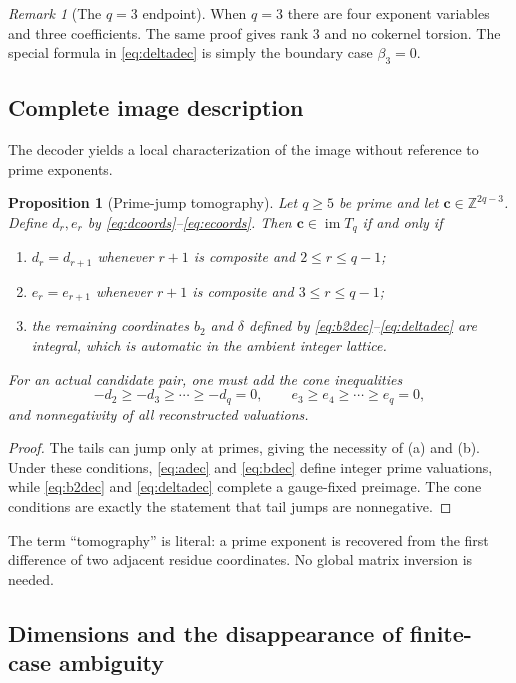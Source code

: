 \documentclass[11pt]{article}
\newtheorem{proposition}[theorem]{Proposition}
\theoremstyle{definition}
\theoremstyle{remark}
\newtheorem{remark}[theorem]{Remark}
\newcommand{\Z}{\mathbb Z}
\newcommand{\im}{\operatorname{im}}
\newcommand{\vct}[1]{\bm{#1}}
\begin{document}
\begin{remark}[The $q=3$ endpoint]
When $q=3$ there are four exponent variables and three coefficients.  The same
proof gives rank $3$ and no cokernel torsion.  The special formula in
\eqref{eq:deltadec} is simply the boundary case $\beta_3=0$.
\end{remark}

\subsection{Complete image description}

The decoder yields a local characterization of the image without reference to
prime exponents.

\begin{proposition}[Prime-jump tomography]\label{prop:tomography}
Let $q\ge5$ be prime and let $\vct c\in\Z^{2q-3}$.  Define $d_r,e_r$ by
\eqref{eq:dcoords}--\eqref{eq:ecoords}.  Then $\vct c\in\im T_q$ if and only if
\begin{enumerate}[label=\textup{(\alph*)}]
\item $d_r=d_{r+1}$ whenever $r+1$ is composite and $2\le r\le q-1$;
\item $e_r=e_{r+1}$ whenever $r+1$ is composite and $3\le r\le q-1$;
\item the remaining coordinates $b_2$ and $\delta$ defined by
\eqref{eq:b2dec}--\eqref{eq:deltadec} are integral, which is automatic in the
ambient integer lattice.
\end{enumerate}
For an actual candidate pair, one must add the cone inequalities
\[
 -d_2\ge-d_3\ge\cdots\ge-d_q=0,
 \qquad
 e_3\ge e_4\ge\cdots\ge e_q=0,
\]
and nonnegativity of all reconstructed valuations.
\end{proposition}

\begin{proof}
The tails can jump only at primes, giving the necessity of (a) and (b).  Under
these conditions, \eqref{eq:adec} and \eqref{eq:bdec} define integer prime
valuations, while \eqref{eq:b2dec} and \eqref{eq:deltadec} complete a gauge-fixed
preimage.  The cone conditions are exactly the statement that tail jumps are
nonnegative.
\end{proof}

The term ``tomography'' is literal: a prime exponent is recovered from the
first difference of two adjacent residue coordinates.  No global matrix
inversion is needed.

\subsection{Dimensions and the disappearance of finite-case ambiguity}
\end{document}
